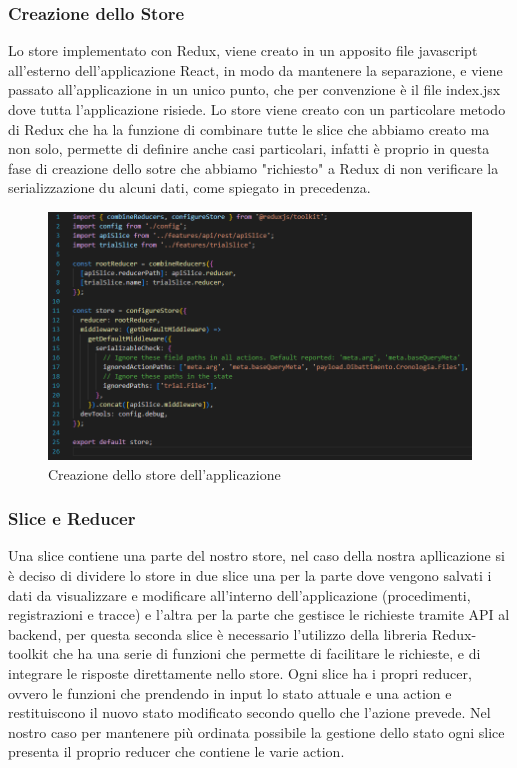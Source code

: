 \subsubsection{Creazione dello Store}
Lo store implementato con Redux, viene creato in un apposito file javascript all'esterno dell'applicazione React, in modo da mantenere la separazione, e viene passato all'applicazione
in un unico punto, che per convenzione è il file index.jsx dove tutta l'applicazione risiede. Lo store viene creato con un particolare metodo di Redux che ha la funzione di combinare
tutte le slice che abbiamo creato ma non solo, permette di definire anche casi particolari, infatti è proprio in questa fase di creazione dello sotre che abbiamo "richiesto" a Redux di non
verificare la serializzazione du alcuni dati, come spiegato in precedenza.

\begin{figure}[H]
  \centering
  \includegraphics[width=\textwidth]{immagini/creazione-store.png}
  \caption{Creazione dello store dell'applicazione}
\end{figure}

\subsubsection{Slice e Reducer}
Una slice contiene una parte del nostro store, nel caso della nostra apllicazione si è deciso di dividere lo store in due slice una per la parte dove vengono salvati i dati da
visualizzare e modificare all'interno dell'applicazione (procedimenti, registrazioni e tracce) e l'altra per la parte che gestisce le richieste tramite API al backend, per questa
seconda slice è necessario l'utilizzo della libreria Redux-toolkit che ha una serie di funzioni che permette di facilitare le richieste, e di integrare le risposte direttamente nello store.
Ogni slice ha i propri reducer, ovvero le funzioni che prendendo in input lo stato attuale e una action e restituiscono il nuovo stato modificato secondo quello che l'azione prevede.
Nel nostro caso per mantenere più ordinata possibile la gestione dello stato ogni slice presenta il proprio reducer che contiene le varie action.

